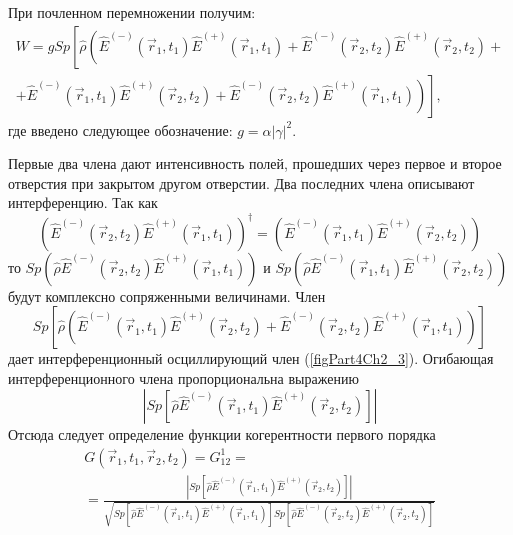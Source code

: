 При почленном перемножении получим:
\begin{eqnarray}
W = 
g Sp \left[\hat{\rho}
\left( 
\hat{E}^{(-)}\left(\vec{r}_1, t_1\right) \hat{E}^{(+)}\left(\vec{r}_1,
t_1\right) +
\hat{E}^{(-)}\left(\vec{r}_2, t_2\right) \hat{E}^{(+)}\left(\vec{r}_2,
t_2\right) +
\right.
\right.
\nonumber \\
\left.
\left.
+
\hat{E}^{(-)}\left(\vec{r}_1, t_1\right) \hat{E}^{(+)}\left(\vec{r}_2,
t_2\right) +
\hat{E}^{(-)}\left(\vec{r}_2, t_2\right) \hat{E}^{(+)}\left(\vec{r}_1,
t_1\right)
\right)
\right],
\label{eqCh4_12}
\end{eqnarray}
где введено следующее обозначение: $g = \alpha \left|\gamma\right|^2$.

Первые два члена дают интенсивность полей, прошедших через первое и
второе отверстия при закрытом другом отверстии. Два последних члена
описывают интерференцию. Так как  
\[
\left(\hat{E}^{(-)}\left(\vec{r}_2, t_2\right) \hat{E}^{(+)}\left(\vec{r}_1,
t_1\right)\right)^{\dag} = 
\left(\hat{E}^{(-)}\left(\vec{r}_1, t_1\right) \hat{E}^{(+)}\left(\vec{r}_2,
t_2\right)\right)
\]
то  
\(
Sp\left(\hat{\rho}\hat{E}^{(-)}\left(\vec{r}_2, t_2\right) \hat{E}^{(+)}\left(\vec{r}_1,
t_1\right)\right)
\)
и 
\(
Sp\left(\hat{\rho}\hat{E}^{(-)}\left(\vec{r}_1, t_1\right) \hat{E}^{(+)}\left(\vec{r}_2,
t_2\right)\right)
\)
будут комплексно сопряженными величинами. Член 
\[
Sp 
\left[
\hat{\rho}
\left(
\hat{E}^{(-)}\left(\vec{r}_1, t_1\right) \hat{E}^{(+)}\left(\vec{r}_2,
t_2\right) +
\hat{E}^{(-)}\left(\vec{r}_2, t_2\right) \hat{E}^{(+)}\left(\vec{r}_1,
t_1\right)
\right)
\right]
\]
дает
интерференционный осциллирующий член (\autoref{figPart4Ch2_3}). Огибающая
интерференционного члена пропорциональна выражению 
\begin{equation}
\left|
Sp \left[
\hat{\rho}
\hat{E}^{(-)}\left(\vec{r}_1, t_1\right) \hat{E}^{(+)}\left(\vec{r}_2,
t_2\right)
\right]
\right|
\label{eqCh4_13}
\end{equation}
Отсюда следует определение функции когерентности первого порядка
\begin{eqnarray}
G\left(\vec{r}_1, t_1, \vec{r}_2, t_2\right) = 
G_{12}^{1} = 
\nonumber \\
= \frac{\left|
Sp \left[
\hat{\rho}
\hat{E}^{(-)}\left(\vec{r}_1, t_1\right) \hat{E}^{(+)}\left(\vec{r}_2,
t_2\right)
\right]
\right|}
{\sqrt{
Sp \left[
\hat{\rho}
\hat{E}^{(-)}\left(\vec{r}_1, t_1\right) \hat{E}^{(+)}\left(\vec{r}_1,
t_1\right)
\right]
Sp \left[
\hat{\rho}
\hat{E}^{(-)}\left(\vec{r}_2, t_2\right) \hat{E}^{(+)}\left(\vec{r}_2,
t_2\right)
\right]
}}
\label{eqCh4_14}
\end{eqnarray}

